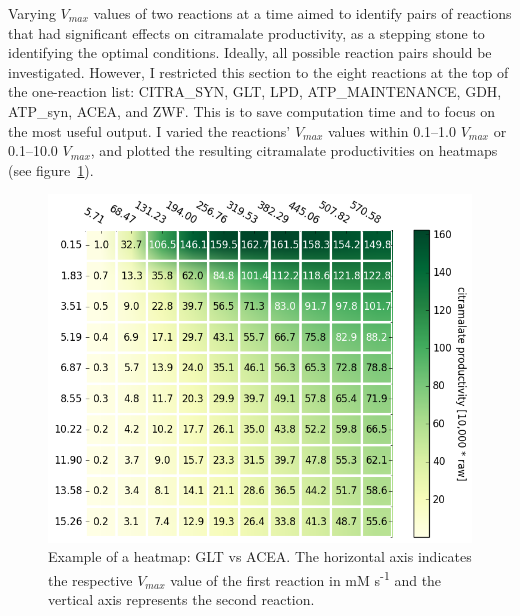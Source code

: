 \documentclass[parskip=full, numbers=noenddot]{scrreprt}
\begin{document}
Varying $V_{max}$ values of two reactions at a time aimed to identify pairs of reactions that had significant effects on citramalate productivity, as a stepping stone to identifying the optimal conditions. Ideally, all possible reaction pairs should be investigated. However, I restricted this section to the eight reactions at the top of the one-reaction list: CITRA\_SYN, GLT, LPD, ATP\_MAINTENANCE, GDH, ATP\_syn, ACEA, and ZWF. This is to save computation time and to focus on the most useful output. I varied the reactions' $V_{max}$ values within 0.1--1.0 $V_{max}$ or 0.1--10.0 $V_{max}$, and plotted the resulting citramalate productivities on heatmaps (see figure~\ref{fig:heatmapsample}). %

\begin{figure}[h]
  \centering
  \includegraphics[scale=0.5]{heatmapsample}
  \caption{Example of a heatmap: GLT vs ACEA. The horizontal axis indicates the respective $V_{max}$ value of the first reaction in mM s\textsuperscript{-1} and the vertical axis represents the second reaction.}
  \label{fig:heatmapsample}
\end{figure}
\end{document}
